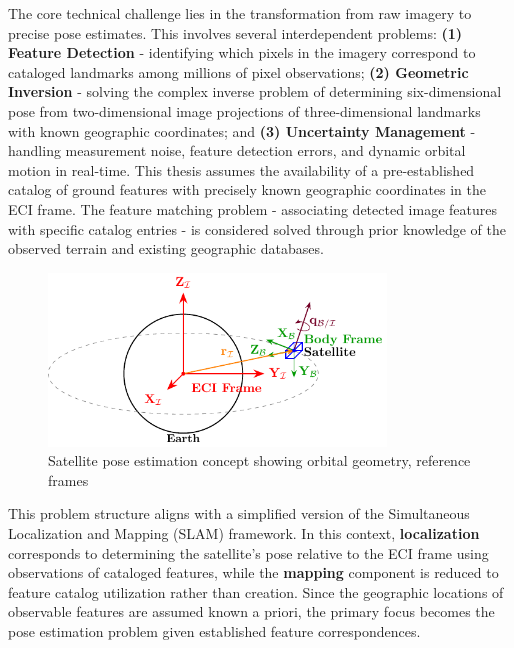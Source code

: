 The core technical challenge lies in the transformation from raw imagery to precise pose estimates. This involves several 
interdependent problems: \textbf{(1) Feature Detection} - identifying which pixels in the imagery correspond to cataloged 
landmarks among millions of pixel observations; \textbf{(2) Geometric Inversion} - solving the complex inverse problem of 
determining six-dimensional pose from two-dimensional image projections of three-dimensional landmarks with known geographic 
coordinates; and \textbf{(3) Uncertainty Management} - handling measurement noise, feature detection errors, and dynamic orbital 
motion in real-time. This thesis assumes the availability of a pre-established catalog of ground features with precisely 
known geographic coordinates in the ECI frame. The feature matching problem - associating detected image features with specific 
catalog entries - is considered solved through prior knowledge of the observed terrain and existing geographic databases.
\vspace{0.5cm}

\begin{figure}[htbp]
    \centering
    \includegraphics[width=0.8\textwidth]{figures/Figure1.pdf}
    \caption{Satellite pose estimation concept showing orbital geometry, reference frames}
    \label{fig:satellite_concept}
\end{figure}

This problem structure aligns with a simplified version of the Simultaneous Localization and Mapping (SLAM) framework. 
In this context, \textbf{localization} corresponds to determining the satellite's pose relative to the ECI frame using 
observations of cataloged features, while the \textbf{mapping} component is reduced to feature catalog utilization rather 
than creation. Since the geographic locations of observable features are assumed known a priori, the primary focus becomes the 
pose estimation problem given established feature correspondences.
\vspace{0.5cm}

